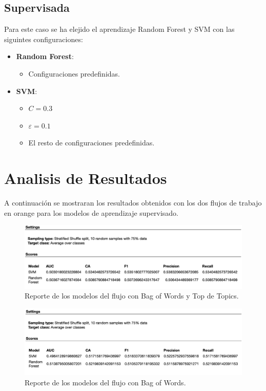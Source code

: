 \documentclass[runningheads]{llncs}
\begin{document}
\subsection{Supervisada}

Para este caso se ha elejido el aprendizaje Random Forest y SVM con las siguintes configuraciones:

\begin{itemize}
    \item \textbf{Random Forest}:
    \begin{itemize}
        \item Configuraciones predefinidas.
    \end{itemize}
    \item \textbf{SVM}:
    \begin{itemize}
        \item $C = 0.3$
        \item $\varepsilon = 0.1$
        \item El resto de configuraciones predefinidas.
    \end{itemize}
\end{itemize}

\section{Analisis de Resultados}

A continuación se mostraran los resultados obtenidos con los dos flujos de trabajo en orange para los modelos de aprendizaje supervisado.

\begin{figure}[H]
    \center
    \includegraphics[width=1\linewidth]{resources/ReportTopTopic.png}
    \caption{ Reporte de los modelos del flujo con Bag of Words y Top de Topics.}
    \label{fig:5}
\end{figure}
\begin{figure}[H]
    \includegraphics[width=1\linewidth]{resources/ReportBagWords.png}
    \caption{ Reporte de los modelos del flujo con Bag of Words.}
    \label{fig:6}
\end{figure}
\end{document}
